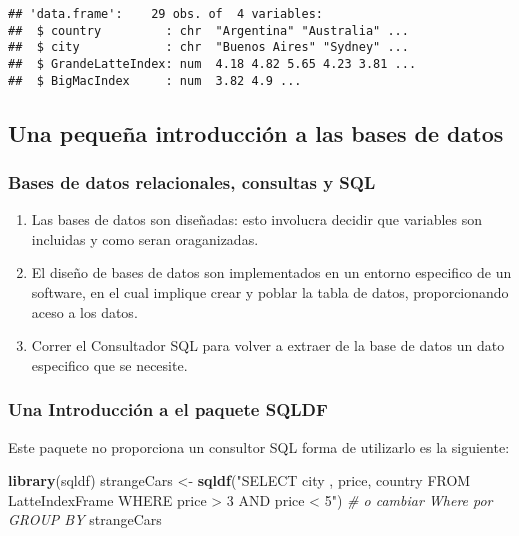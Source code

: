 \documentclass[]{article}
\newenvironment{Shaded}{\begin{snugshade}}{\end{snugshade}}
\newcommand{\CommentTok}[1]{\textcolor[rgb]{0.56,0.35,0.01}{\textit{#1}}}
\newcommand{\KeywordTok}[1]{\textcolor[rgb]{0.13,0.29,0.53}{\textbf{#1}}}
\newcommand{\NormalTok}[1]{#1}
\newcommand{\StringTok}[1]{\textcolor[rgb]{0.31,0.60,0.02}{#1}}
\providecommand{\tightlist}{%
  \setlength{\itemsep}{0pt}\setlength{\parskip}{0pt}}
\begin{document}
\begin{verbatim}
## 'data.frame':    29 obs. of  4 variables:
##  $ country         : chr  "Argentina" "Australia" ...
##  $ city            : chr  "Buenos Aires" "Sydney" ...
##  $ GrandeLatteIndex: num  4.18 4.82 5.65 4.23 3.81 ...
##  $ BigMacIndex     : num  3.82 4.9 ...
\end{verbatim}

\hypertarget{una-pequeuxf1a-introducciuxf3n-a-las-bases-de-datos}{%
\subsection{Una pequeña introducción a las bases de
datos}\label{una-pequeuxf1a-introducciuxf3n-a-las-bases-de-datos}}

\hypertarget{bases-de-datos-relacionales-consultas-y-sql}{%
\subsubsection{Bases de datos relacionales, consultas y
SQL}\label{bases-de-datos-relacionales-consultas-y-sql}}

\begin{enumerate}
\def\labelenumi{\arabic{enumi}.}
\tightlist
\item
  Las bases de datos son diseñadas: esto involucra decidir que variables
  son incluidas y como seran oraganizadas.
\item
  El diseño de bases de datos son implementados en un entorno especifico
  de un software, en el cual implique crear y poblar la tabla de datos,
  proporcionando aceso a los datos.
\item
  Correr el Consultador SQL para volver a extraer de la base de datos un
  dato especifico que se necesite.
\end{enumerate}

\hypertarget{una-introducciuxf3n-a-el-paquete-sqldf}{%
\subsubsection{Una Introducción a el paquete
SQLDF}\label{una-introducciuxf3n-a-el-paquete-sqldf}}

Este paquete no proporciona un consultor SQL forma de utilizarlo es la
siguiente:

\begin{Shaded}
\begin{Highlighting}[]
\KeywordTok{library}\NormalTok{(sqldf)}
\NormalTok{strangeCars <-}\StringTok{ }\KeywordTok{sqldf}\NormalTok{(}\StringTok{"SELECT city , price, country}
\StringTok{                      FROM LatteIndexFrame}
\StringTok{                      WHERE price > 3 AND price < 5"}\NormalTok{) }\CommentTok{# o cambiar Where por GROUP BY}
\NormalTok{strangeCars}
\end{Highlighting}
\end{Shaded}
\end{document}

